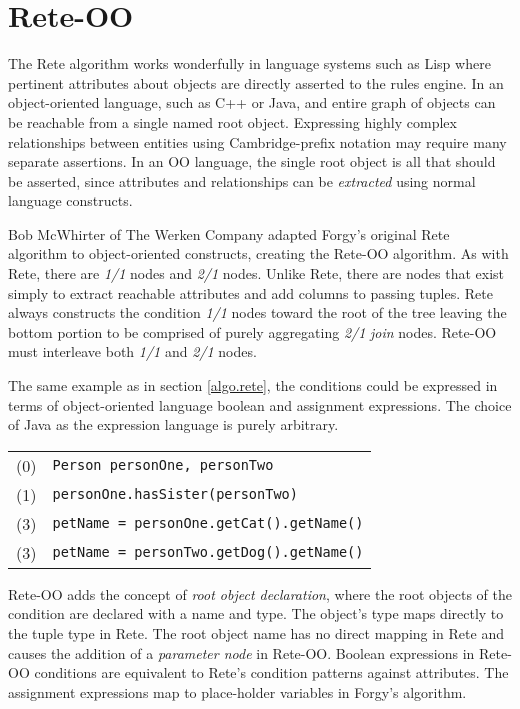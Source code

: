 \section{Rete-OO}

The Rete algorithm works wonderfully in language systems 
such as Lisp where pertinent attributes about objects 
are directly asserted to the rules engine.  In an
object-oriented language, such as C++ or Java, and entire 
graph of objects can be reachable from a single named 
root object.  Expressing highly complex relationships between
entities using Cambridge-prefix notation may require many
separate assertions.  In an OO language, the single root
object is all that should be asserted, since attributes 
and relationships can be \emph{extracted} using normal
language constructs.

Bob McWhirter of The Werken Company adapted Forgy's original Rete 
algorithm to object-oriented constructs, creating the Rete-OO algorithm.
As with Rete, there are \emph{1/1} nodes and \emph{2/1}
nodes.  Unlike Rete, there are nodes that exist simply 
to extract reachable attributes and add columns to passing
tuples. Rete always constructs the condition \emph{1/1} nodes toward
the root of the tree leaving the bottom portion to be 
comprised of purely aggregating \emph{2/1} \emph{join} nodes.  
Rete-OO must interleave both \emph{1/1} and \emph{2/1} nodes.

The same example as in section \ref{algo.rete}, 
the conditions could be expressed in terms of object-oriented
language boolean and assignment expressions.  The choice
of Java as the expression language is purely arbitrary.

\medskip

\begin{tabular}{cl}
(0) & \texttt{Person personOne, personTwo} \\
(1) & \texttt{personOne.hasSister(personTwo)} \\
(3) & \texttt{petName = personOne.getCat().getName()} \\
(3) & \texttt{petName = personTwo.getDog().getName()} \\
\end{tabular}

\bigskip

Rete-OO adds the concept of \emph{root object declaration}, where 
the root objects of the condition are declared with a
name and type.  The object's type maps directly to the
tuple type in Rete.  The root object name has no direct
mapping in Rete and causes the addition of a \emph{parameter node}
in Rete-OO.  Boolean expressions in Rete-OO conditions are
equivalent to Rete's condition patterns against attributes.
The assignment expressions map to place-holder variables in
Forgy's algorithm.

